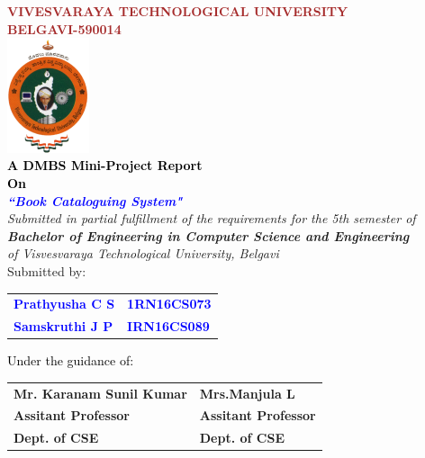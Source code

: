 
\begin{titlepage}
\begin{center}
\break\break
\textup{\large {\textcolor{brown}{\bf VIVESVARAYA TECHNOLOGICAL UNIVERSITY} \\ {\textcolor{brown}{\bf BELGAVI-590014}}}}\\[0.1in]
\includegraphics[width=0.18\textwidth]{./VTU.png}\\[0.1in]
\textup{\small {\textcolor{black}{\textbf {A DMBS Mini-Project Report} \\ {\textbf {On}}}}} \\[0.2in]
\textup{\large {\textcolor{blue}{\textbf {\textit {``Book Cataloguing System"}}}}} \\[0.2in]
\textup{{\textit {Submitted in partial fulfillment of the requirements for the 5th semester of} \\ {\textbf {\textit {Bachelor of Engineering in Computer Science and Engineering}} \\ \textit {of Visvesvaraya Technological University, Belgavi}}}}\\[0.15in]
\textup{Submitted by:} 
\break\break
\begin{tabular}{l  l}
\textcolor{blue}{\textbf{Prathyusha C S}} & \textcolor{blue}{\hspace{2.7cm}\textbf{1RN16CS073}}\\[0.3in]
\textcolor{blue}{\textbf{Samskruthi J P}} & \textcolor{blue}{\hspace{2.7cm}\textbf{IRN16CS089}}\\
\end{tabular}
\break\break\break\break
\textup{\normalsize {\textcolor{black}{ Under the guidance of:}}}\break\break
\begin{tabular}{l  l}
\textbf{Mr. Karanam Sunil Kumar} & \hspace{2.7cm}\textbf{Mrs.Manjula L}\\
\textbf{Assitant Professor} & \hspace{2.7cm}\textbf{Assitant Professor}\\
\textbf{Dept. of CSE} & \hspace{2.7cm}\textbf{Dept. of CSE}\\
\end{tabular}


\end{center}
\end{titlepage}
